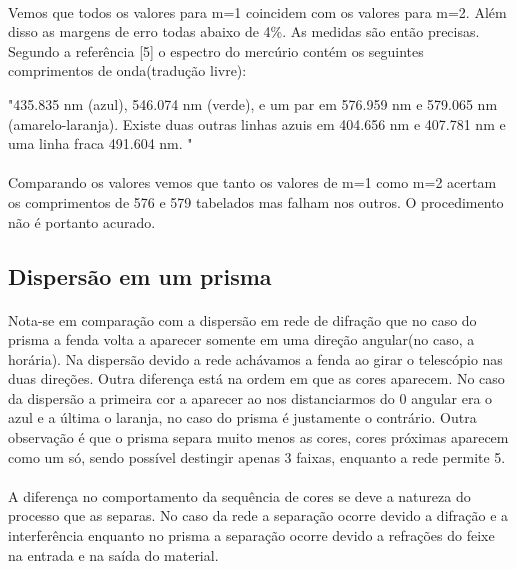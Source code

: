 \documentclass[a4paper,11pt]{article}
\begin{document}
\paragraph{}Vemos que todos os valores para m=1 coincidem com os valores
para m=2. Além disso as margens de erro todas abaixo de 4\%. As medidas são
então precisas. Segundo a referência [5] o espectro do mercúrio contém os 
seguintes comprimentos de onda(tradução livre):

 "435.835 nm (azul), 546.074 nm (verde), e um par
em 576.959 nm e 579.065 nm (amarelo-laranja). Existe duas outras linhas azuis em
 404.656 nm e 407.781 nm e uma linha fraca  491.604 nm. "

\paragraph{}Comparando os valores vemos que tanto os valores de m=1 como m=2
acertam os comprimentos de 576 e 579 tabelados mas falham nos outros. O 
procedimento não é portanto acurado.

\subsection{Dispersão em um prisma}
\paragraph{}Nota-se  em
comparação com a dispersão em rede de difração que no caso do prisma a fenda
volta a aparecer somente em uma direção angular(no caso, a
horária). Na dispersão devido a rede achávamos a fenda ao
girar o telescópio nas duas direções. Outra diferença está
na ordem em que as cores aparecem. No caso da dispersão a
primeira cor a aparecer ao nos distanciarmos do 0 angular
era o azul e a última o laranja, no caso do prisma é
justamente o contrário. Outra observação é que o prisma
separa muito menos as cores, cores próximas aparecem como um
só, sendo possível destingir apenas 
3 faixas, enquanto a rede permite 5.

\paragraph{}A diferença no comportamento da sequência de
cores se deve a natureza do processo que as separas. No caso
da rede a separação ocorre devido a difração e a
interferência enquanto no prisma a separação ocorre devido a
refrações do feixe na entrada e na saída do material.
\end{document}
